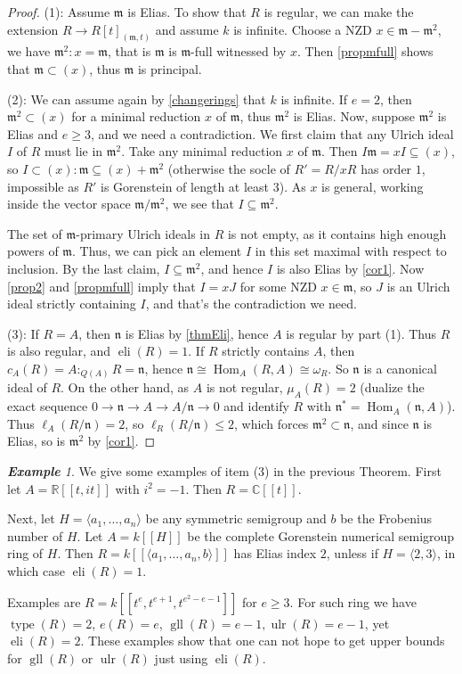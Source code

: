 \documentclass[a4paper,12pt]{amsart}
\theoremstyle{definition}
\theoremstyle{remark}
\newtheorem{example}[thm]{\bf Example}
\numberwithin{equation}{section}
\DeclareMathOperator{\type}{{type}}
\DeclareMathOperator{\Hom}{{Hom}}
\DeclareMathOperator{\eli}{{eli}}
\DeclareMathOperator{\gll}{gll}
\DeclareMathOperator{\ulr}{{ulr}}
\def\fn{\mathfrak{n}}
\def\fm{\mathfrak{m}}
\def \CC{\mathbb C}
\def \RR{\mathbb R}
\newcommand{\ses}[3]{0 \to {#1} \to {#2} \to {#3} \to 0}
\begin{document}
\begin{proof}
(1): Assume  $\fm$ is Elias. To show that $R$ is regular, we can make the extension $R\to R[t]_{(\fm,t)}$ and assume $k$ is infinite. Choose a NZD $x\in \fm-\fm^2$, we have $\fm^2:x=\fm$, that is $\fm$ is $\fm$-full witnessed by $x$. Then \ref{propmfull} shows that $\fm\subset (x)$, thus $\fm$ is principal. 

(2): We can assume again by \ref{changerings} that  $k$ is infinite. If $e=2$, then $\fm^2\subset (x)$ for a minimal reduction $x$ of $\fm$, thus $\fm^2$ is Elias. Now, suppose $\fm^2$ is Elias and $e\geq 3$, and we need a contradiction. We first claim that any Ulrich ideal $I$ of $R$ must lie in $\fm^2$. Take any  minimal reduction $x$ of $\fm$. Then $I\fm=xI\subseteq (x)$, so $I\subset (x):\fm\subseteq (x)+\fm^2$ (otherwise the socle of $R'= R/xR$ has order $1$, impossible as $R'$ is Gorenstein of length at least $3$). As $x$ is general, working inside the vector space $\fm/\fm^2$, we see that $I\subseteq \fm^2$.  

The set of $\fm$-primary Ulrich ideals in $R$ is not empty, as it contains high enough powers of $\fm$. Thus, we can pick an element $I$ in this set maximal with respect to inclusion. By the last claim, $I\subseteq \fm^2$, and hence $I$ is also Elias by \ref{cor1}. Now \ref{prop2} and \ref{propmfull} imply that $I=xJ$ for some NZD $x\in \fm$, so $J$ is an Ulrich ideal strictly containing $I$, and that's the contradiction we need.

(3): If $R=A$, then $\fn$ is Elias by \ref{thmEli}, hence $A$ is regular by part (1). Thus $R$ is also regular, and $\eli(R)=1$. If $R$ strictly contains $A$, then $c_A(R) = A:_{Q(A)}R= \fn$, hence $\fn \cong \Hom_A(R,A) \cong \omega_R$. So $\fn$ is a canonical ideal of $R$. On the other hand,  as $A$ is not regular, $\mu_A(R)=2$ (dualize the exact sequence $\ses{\fn}{A}{A/\fn}$ and identify $R$ with $\fn^*=\Hom_A(\fn, A)$). Thus $\ell_A(R/\fn)=2$, so $\ell_R(R/\fn)\leq 2$, which forces $\fm^2 \subset \fn$, and since $\fn$ is Elias, so is  $\fm^2$ by \ref{cor1}.  

\end{proof}

\begin{example}\label{ind2_ex}
We give some examples of item (3) in the previous Theorem. First let $A=\RR[[t,it]]$ with $i^2=-1$. Then $R =\CC[[t]]$. 

Next, let $H=\langle a_1,\dots, a_n \rangle$ be any symmetric semigroup and $b$ be the Frobenius number of $H$. Let $A=k[[H]]$ be the complete Gorenstein numerical semigroup ring 
of $H$. Then $R=k[[\langle a_1,\dots, a_n, b \rangle]]$ has Elias index $2$, unless if $H=\langle 2,3 \rangle$, in which case $\eli(R)=1$. 

Examples are $R=k[[ t^{e},t^{e+1}, t^{e^2-e-1}]]$ for $e\geq 3$. For such ring we have $\type(R)=2$, $e(R)=e$, $\gll(R)=e-1, \ulr(R)=e-1$, yet $\eli(R)=2$. These examples show that one can not hope to get upper bounds for $\gll(R)$ or $\ulr(R)$ just using $\eli(R)$. 
\end{example}
\end{document}
